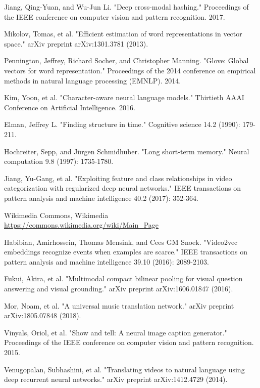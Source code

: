 \documentclass[runningheads]{llncs}
\begin{document}
\begin{thebibliography}{8}
Jiang, Qing-Yuan, and Wu-Jun Li. "Deep cross-modal hashing." Proceedings of the IEEE conference on computer vision and pattern recognition. 2017.

Mikolov, Tomas, et al. "Efficient estimation of word representations in vector space." arXiv preprint arXiv:1301.3781 (2013).

Pennington, Jeffrey, Richard Socher, and Christopher Manning. "Glove: Global vectors for word representation." Proceedings of the 2014 conference on empirical methods in natural language processing (EMNLP). 2014.

Kim, Yoon, et al. "Character-aware neural language models." Thirtieth AAAI Conference on Artificial Intelligence. 2016.

Elman, Jeffrey L. "Finding structure in time." Cognitive science 14.2 (1990): 179-211.

Hochreiter, Sepp, and Jürgen Schmidhuber. "Long short-term memory." Neural computation 9.8 (1997): 1735-1780.

Jiang, Yu-Gang, et al. "Exploiting feature and class relationships in video categorization with regularized deep neural networks." IEEE transactions on pattern analysis and machine intelligence 40.2 (2017): 352-364.

Wikimedia Commons, Wikimedia\\
\url{https://commons.wikimedia.org/wiki/Main_Page}


Habibian, Amirhossein, Thomas Mensink, and Cees GM Snoek. "Video2vec embeddings recognize events when examples are scarce." IEEE transactions on pattern analysis and machine intelligence 39.10 (2016): 2089-2103.

Fukui, Akira, et al. "Multimodal compact bilinear pooling for visual question answering and visual grounding." arXiv preprint arXiv:1606.01847 (2016).

Mor, Noam, et al. "A universal music translation network." arXiv preprint arXiv:1805.07848 (2018).

Vinyals, Oriol, et al. "Show and tell: A neural image caption generator." Proceedings of the IEEE conference on computer vision and pattern recognition. 2015.

Venugopalan, Subhashini, et al. "Translating videos to natural language using deep recurrent neural networks." arXiv preprint arXiv:1412.4729 (2014).


\end{thebibliography}
\end{document}
